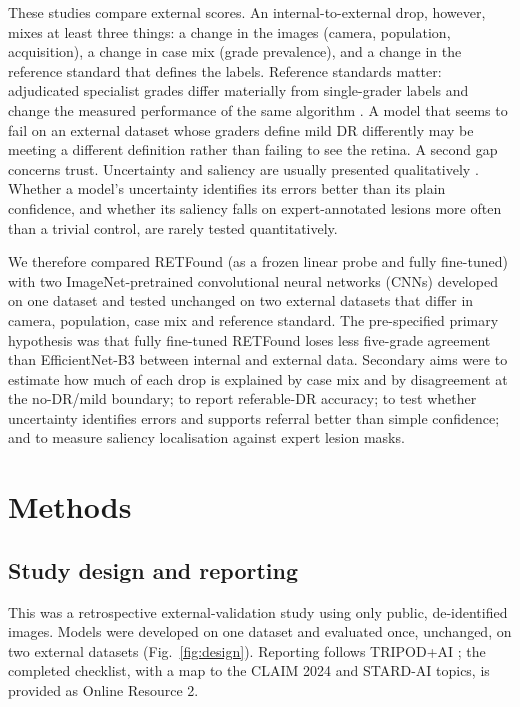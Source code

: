 \documentclass[pdflatex,sn-basic,Numbered]{sn-jnl}
\begin{document}
These studies compare external scores. An internal-to-external drop, however, mixes at least three things: a change in the images (camera, population, acquisition), a change in case mix (grade prevalence), and a change in the reference standard that defines the labels. Reference standards matter: adjudicated specialist grades differ materially from single-grader labels and change the measured performance of the same algorithm \cite{krause2018}. A model that seems to fail on an external dataset whose graders define mild DR differently may be meeting a different definition rather than failing to see the retina. A second gap concerns trust. Uncertainty and saliency are usually presented qualitatively \cite{mahapadi2025,alizadeh2024}. Whether a model's uncertainty identifies its errors better than its plain confidence, and whether its saliency falls on expert-annotated lesions more often than a trivial control, are rarely tested quantitatively.

We therefore compared RETFound (as a frozen linear probe and fully fine-tuned) with two ImageNet-pretrained convolutional neural networks (CNNs) developed on one dataset and tested unchanged on two external datasets that differ in camera, population, case mix and reference standard. The pre-specified primary hypothesis was that fully fine-tuned RETFound loses less five-grade agreement than EfficientNet-B3 between internal and external data. Secondary aims were to estimate how much of each drop is explained by case mix and by disagreement at the no-DR/mild boundary; to report referable-DR accuracy; to test whether uncertainty identifies errors and supports referral better than simple confidence; and to measure saliency localisation against expert lesion masks.

\section{Methods}\label{sec:methods}

\subsection{Study design and reporting}

This was a retrospective external-validation study using only public, de-identified images. Models were developed on one dataset and evaluated once, unchanged, on two external datasets (Fig.~\ref{fig:design}). Reporting follows TRIPOD+AI \cite{tripodai2024}; the completed checklist, with a map to the CLAIM 2024 \cite{claim2024} and STARD-AI \cite{stardai2025} topics, is provided as Online Resource 2.
\end{document}
